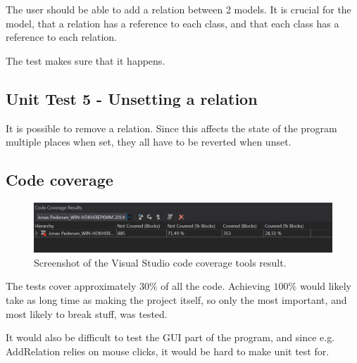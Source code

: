 The user should be able to add a relation between 2 models. It is crucial for
the model, that a relation has a reference to each class, and that each class has
a reference to each relation.

The test makes sure that it happens.

\subsection{Unit Test 5 - Unsetting a relation}

It is possible to remove a relation. Since this affects the state of the program
multiple places when set, they all have to be reverted when unset.


\subsection{Code coverage}

\begin{figure}
\centering
\includegraphics[width=0.85\linewidth]{img/coverage}
\caption{Screenshot of the Visual Studio code coverage tools result.}
\end{figure}

The tests cover approximately $30\%$ of all the code. Achieving $100\%$ would
likely take as long time as making the project itself, so only the most
important, and most likely to break stuff, was tested.

It would also be difficult to test the GUI part of the program, and since e.g.
AddRelation relies on mouse clicks, it would be hard to make unit test for.

